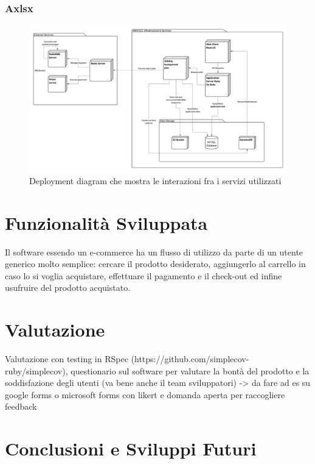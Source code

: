 \documentclass[target=bach,aauheader=,style=]{thud}
\begin{document}
\subsection{Axlsx}
\begin{figure}[h]
\centering
\includegraphics[width=1\linewidth]{Deployment Diagram.png}
\caption{Deployment diagram che mostra le interazioni fra i servizi utilizzati}
\label{fig:dep_diagram}
\end{figure}

\chapter{Funzionalità Sviluppata}

Il software essendo un e-commerce ha un flusso di utilizzo da parte di un utente generico molto semplice: cercare il prodotto desiderato,
aggiungerlo al carrello in caso lo si voglia acquistare, effettuare il pagamento e il check-out ed infine usufruire del prodotto acquistato.


\chapter{Valutazione}

Valutazione con testing in RSpec (https://github.com/simplecov-ruby/simplecov), questionario sul software per valutare
la bontà del prodotto e la soddisfazione degli utenti (va bene anche il team sviluppatori) -> da fare ad es su google forms o
microsoft forms con likert e domanda aperta per raccogliere feedback

\chapter{Conclusioni e Sviluppi Futuri}
\end{document}

